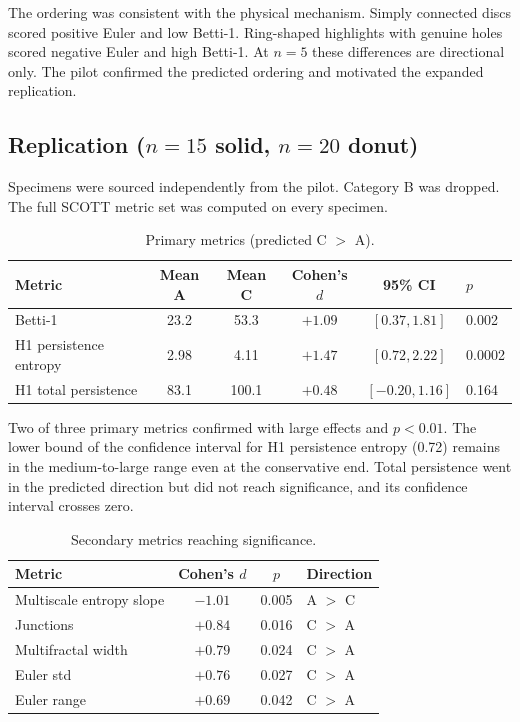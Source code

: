 \documentclass[11pt,a4paper]{article}
\begin{document}
The ordering was consistent with the physical mechanism. Simply connected discs scored positive Euler and low Betti-1. Ring-shaped highlights with genuine holes scored negative Euler and high Betti-1. At $n=5$ these differences are directional only. The pilot confirmed the predicted ordering and motivated the expanded replication.

\subsection{Replication ($n=15$ solid, $n=20$ donut)}

Specimens were sourced independently from the pilot. Category B was dropped. The full SCOTT metric set was computed on every specimen.

\begin{table}[h]
\centering
\caption{Primary metrics (predicted C $>$ A).}
\begin{tabular}{lccccl}
\toprule
Metric & Mean A & Mean C & Cohen's $d$ & 95\% CI & $p$ \\
\midrule
Betti-1 & 23.2 & 53.3 & $+1.09$ & $[0.37, 1.81]$ & 0.002 \\
H1 persistence entropy & 2.98 & 4.11 & $+1.47$ & $[0.72, 2.22]$ & 0.0002 \\
H1 total persistence & 83.1 & 100.1 & $+0.48$ & $[-0.20, 1.16]$ & 0.164 \\
\bottomrule
\end{tabular}
\end{table}

Two of three primary metrics confirmed with large effects and $p < 0.01$. The lower bound of the confidence interval for H1 persistence entropy (0.72) remains in the medium-to-large range even at the conservative end. Total persistence went in the predicted direction but did not reach significance, and its confidence interval crosses zero.

\begin{table}[h]
\centering
\caption{Secondary metrics reaching significance.}
\begin{tabular}{lccl}
\toprule
Metric & Cohen's $d$ & $p$ & Direction \\
\midrule
Multiscale entropy slope & $-1.01$ & 0.005 & A $>$ C \\
Junctions & $+0.84$ & 0.016 & C $>$ A \\
Multifractal width & $+0.79$ & 0.024 & C $>$ A \\
Euler std & $+0.76$ & 0.027 & C $>$ A \\
Euler range & $+0.69$ & 0.042 & C $>$ A \\
\bottomrule
\end{tabular}
\end{table}
\end{document}
